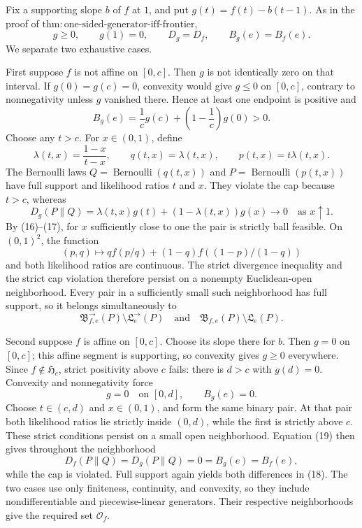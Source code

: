 Fix a supporting slope \(b\) of \(f\) at \(1\), and put \(g(t)=f(t)-b(t-1)\).  As in the proof of \(\mathrm{thm:one\text{-}sided\text{-}generator\text{-}iff\text{-}frontier}\),
\[
 g\ge0,\qquad g(1)=0,\qquad D_g=D_f,\qquad B_g(e)=B_f(e). \tag{15}
\]
We separate two exhaustive cases.

First suppose \(f\) is not affine on \([0,c]\).  Then \(g\) is not identically zero on that interval.  If \(g(0)=g(c)=0\), convexity would give \(g\le0\) on \([0,c]\), contrary to nonnegativity unless \(g\) vanished there.  Hence at least one endpoint is positive and
\[
 B_g(e)=\frac1c g(c)+\left(1-\frac1c\right)g(0)>0. \tag{16}
\]
Choose any \(t>c\).  For \(x\in(0,1)\), define
\[
 \lambda(t,x)=\frac{1-x}{t-x},\qquad
 q(t,x)=\lambda(t,x),\qquad p(t,x)=t\lambda(t,x).
\]
The Bernoulli laws \(Q=\operatorname{Bernoulli}(q(t,x))\) and \(P=\operatorname{Bernoulli}(p(t,x))\) have full support and likelihood ratios \(t\) and \(x\).  They violate the cap because \(t>c\), whereas
\[
 D_g(P\|Q)=\lambda(t,x)g(t)+(1-\lambda(t,x))g(x)\longrightarrow0
 \quad\text{as }x\uparrow1. \tag{17}
\]
By (16)--(17), for \(x\) sufficiently close to one the pair is strictly ball feasible.  On \((0,1)^2\), the function
\[
 (p,q)\longmapsto qf(p/q)+(1-q)f((1-p)/(1-q))
\]
and both likelihood ratios are continuous.  The strict divergence inequality and the strict cap violation therefore persist on a nonempty Euclidean-open neighborhood.  Every pair in a sufficiently small such neighborhood has full support, so it belongs simultaneously to
\[
 \mathfrak B^{\to}_{f,e}(P)\setminus\mathfrak L^{\to}_e(P)
 \quad\text{and}\quad
 \mathfrak B_{f,e}(P)\setminus\mathfrak L_e(P). \tag{18}
\]

Second suppose \(f\) is affine on \([0,c]\).  Choose its slope there for \(b\).  Then \(g=0\) on \([0,c]\); this affine segment is supporting, so convexity gives \(g\ge0\) everywhere.  Since \(f\notin\mathfrak H_c\), strict positivity above \(c\) fails: there is \(d>c\) with \(g(d)=0\).  Convexity and nonnegativity force
\[
 g=0\quad\text{on }[0,d],\qquad B_g(e)=0. \tag{19}
\]
Choose \(t\in(c,d)\) and \(x\in(0,1)\), and form the same binary pair.  At that pair both likelihood ratios lie strictly inside \((0,d)\), while the first is strictly above \(c\).  These strict conditions persist on a small open neighborhood.  Equation (19) then gives throughout the neighborhood
\[
 D_f(P\|Q)=D_g(P\|Q)=0=B_g(e)=B_f(e),
\]
while the cap is violated.  Full support again yields both differences in (18).  The two cases use only finiteness, continuity, and convexity, so they include nondifferentiable and piecewise-linear generators.  Their respective neighborhoods give the required set \(\mathcal O_f\).